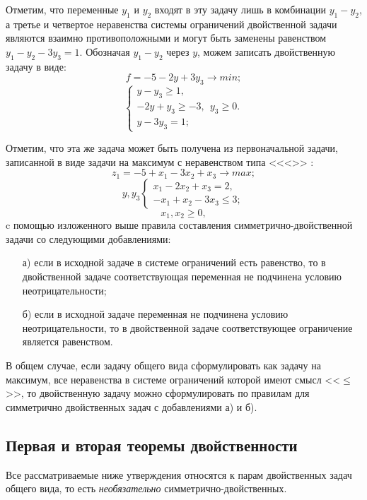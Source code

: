 Отметим, что переменные $y_1$ и $y_2$ входят в эту задачу лишь в комбинации $y_1 - y_2$, а третье и четвертое неравенства системы ограничений двойственной задачи являются взаимно противоположными и могут быть заменены равенством $y_1 - y_2 - 3y_3 = 1$. Обозначая $y_1 - y_2$ через $y$, можем записать двойственную задачу в виде:
\[
f = -5 - 2y + 3y_3 \rightarrow min;
\]
\[
\begin{cases}
y - y_3 \ge 1, \\
-2y + y_3 \ge -3, \ \ y_3 \ge 0. \\
y - 3y_3 = 1;
\end{cases}
\]

Отметим, что эта же задача может быть получена из первоначальной задачи, записанной в виде задачи на максимум с неравенством типа <<<>> :
\[
z_1 = -5 + x_1 - 3x_2 + x_3 \rightarrow max;
\]
\[
y, y_3
\begin{cases}
x_1 - 2x_2 + x_3 = 2, \\
-x_1 + x_2 - 3x_3 \le 3;
\end{cases}
\]
\[
x_1, x_2 \ge 0,
\]
c помощью изложенного выше правила составления симметрично-двойственной задачи со следующими добавлениями:
\begin{enumerate}
\item[а)] если в исходной задаче в системе ограничений  есть  равенство, то в двойственной задаче соответствующая переменная не подчинена условию неотрицательности;
\item[б)] если в исходной задаче переменная не подчинена условию неотрицательности, то в двойственной задаче соответствующее ограничение  является равенством.
\end{enumerate}

В общем случае, если задачу общего вида сформулировать как задачу на максимум, все неравенства в системе ограничений которой имеют смысл <<$\leq{}$>>, то двойственную задачу можно сформулировать по правилам для симметрично двойственных задач с добавлениями
а) и б).

\subsection{Первая и вторая теоремы двойственности}

Все рассматриваемые ниже утверждения относятся к парам двойственных задач общего вида, то есть \textit{необязательно} симметрично-двойственных. \\

 \\

